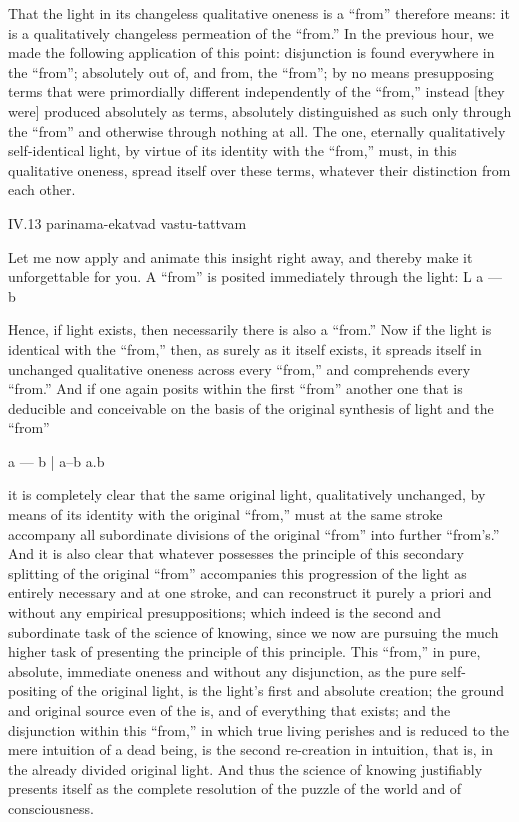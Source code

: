 That the light in its changeless qualitative oneness
is a “from” therefore means:
it is a qualitatively changeless
permeation of the “from.”
In the previous hour,
we made the following application of this point:
disjunction is found everywhere in the “from”;
absolutely out of, and from, the “from”;
by no means presupposing terms
that were primordially different
independently of the “from,”
instead [they were] produced absolutely as terms,
absolutely distinguished as such
only through the “from”
and otherwise through nothing at all.
The one, eternally qualitatively self-identical light,
by virtue of its identity with the “from,”
must, in this qualitative oneness,
spread itself over these terms,
whatever their distinction from each other.

IV.13
parinama-ekatvad vastu-tattvam

Let me now apply and animate this insight right away,
and thereby make it unforgettable for you.
A “from” is posited immediately through the light:
L
a — b

Hence, if light exists,
then necessarily there is also a “from.”
Now if the light is identical with the “from,”
then, as surely as it itself exists,
it spreads itself in unchanged qualitative oneness
across every “from,” and comprehends every “from.”
And if one again posits within the first “from”
another one that is deducible and conceivable
on the basis of the original synthesis of
light and the “from”

a — b
|
a–b a.b

it is completely clear that the same original light,
qualitatively unchanged,
by means of its identity with the original “from,”
must at the same stroke accompany
all subordinate divisions of
the original “from” into
further “from's.”
And it is also clear that whatever possesses
the principle of this secondary splitting
of the original “from” accompanies
this progression of the light
as entirely necessary and at one stroke,
and can reconstruct it purely a priori
and without any empirical presuppositions;
which indeed is the second and subordinate task
of the science of knowing,
since we now are pursuing the much higher task
of presenting the principle of this principle.
This “from,” in pure, absolute, immediate oneness
and without any disjunction,
as the pure self-positing of the original light,
is the light's first and absolute creation;
the ground and original source even of the is,
and of everything that exists;
and the disjunction within this “from,”
in which true living perishes and is reduced
to the mere intuition of a dead being,
is the second re-creation in intuition,
that is, in the already divided original light.
And thus the science of knowing justifiably presents itself
as the complete resolution of the puzzle of the world
and of consciousness.

